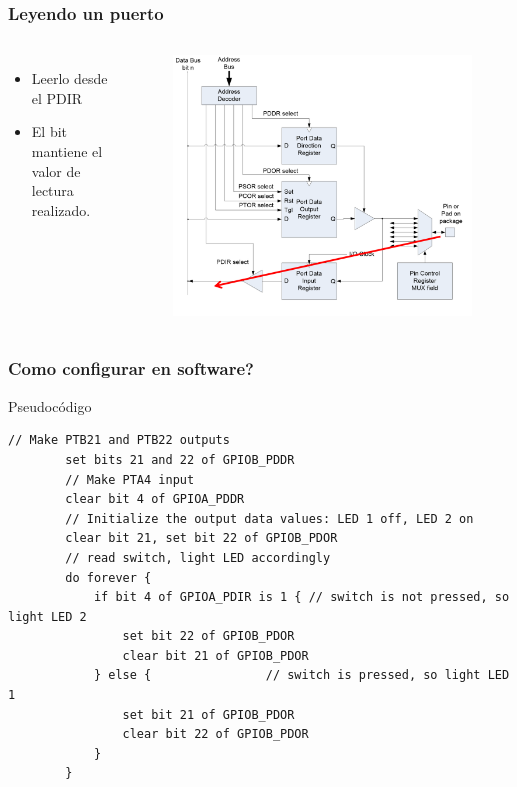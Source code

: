 \documentclass[10.5pt,scale=1.0,t,aspectratio=169,hyperref={pdfpagelabels=false}]{beamer}
\begin{document}
\begin{frame}
	\frametitle{Leyendo un puerto}
	\begin{columns}
		\begin{itemize}
			\item Leerlo desde el PDIR
			\item El bit mantiene el valor de lectura realizado.  
		\end{itemize}
		
		\begin{figure}
			\centering
			\includegraphics[scale=0.3]{13_ReadingGPIO}
		\end{figure}
	\end{columns}
\end{frame}
\begin{frame}[fragile]
	\frametitle{Como configurar en software?}
	Pseudocódigo
	\begin{lstlisting}[style=CStyle]
		// Make PTB21 and PTB22 outputs
		set bits 21 and 22 of GPIOB_PDDR 
		// Make PTA4 input
		clear bit 4 of GPIOA_PDDR
		// Initialize the output data values: LED 1 off, LED 2 on
		clear bit 21, set bit 22 of GPIOB_PDOR
		// read switch, light LED accordingly
		do forever {
			if bit 4 of GPIOA_PDIR is 1 { // switch is not pressed, so light LED 2
				set bit 22 of GPIOB_PDOR
				clear bit 21 of GPIOB_PDOR
			} else {			    // switch is pressed, so light LED 1
				set bit 21 of GPIOB_PDOR
				clear bit 22 of GPIOB_PDOR
			}
		}
	\end{lstlisting}
\end{frame}
\end{document}
